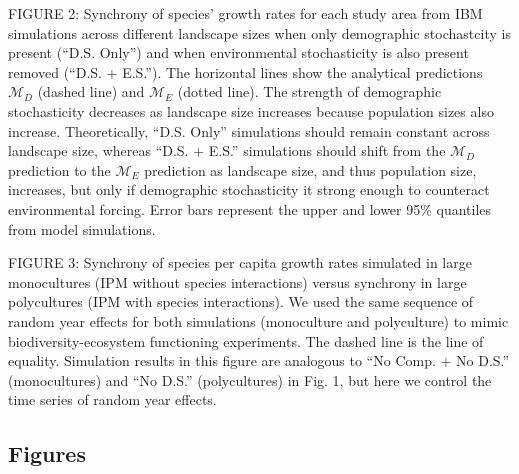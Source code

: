\documentclass[12pt,]{article}
\begin{document}
FIGURE 2: Synchrony of species' growth rates for each study area from IBM simulations across different landscape sizes when only demographic stochastcity is present (``D.S. Only'') and when environmental stochasticity is also present removed (``D.S. + E.S.''). The horizontal lines show the analytical predictions $\mathcal{M}_D$ (dashed line) and $\mathcal{M}_E$ (dotted line). The strength of demographic stochasticity decreases as landscape size increases because population sizes also increase. Theoretically, ``D.S. Only'' simulations should remain constant across landscape size, whereas ``D.S. + E.S.'' simulations should shift from the $\mathcal{M}_D$ prediction to the $\mathcal{M}_E$ prediction as landscape size, and thus population size, increases, but only if demographic stochasticity it strong enough to counteract environmental forcing. Error bars represent the upper and lower 95\% quantiles from model simulations.

FIGURE 3: Synchrony of species per capita growth rates simulated in large monocultures (IPM without species interactions) versus synchrony in large polycultures (IPM with species interactions). We used the same sequence of random year effects for both simulations (monoculture and polyculture) to mimic biodiversity-ecosystem functioning experiments. The dashed line is the line of equality. Simulation results in this figure are analogous to ``No Comp. + No D.S.'' (monocultures) and ``No D.S.'' (polycultures) in Fig. 1, but here we control the time series of random year effects.

\newpage{}

\singlespacing

\subsection{Figures}\label{figures}
\end{document}

